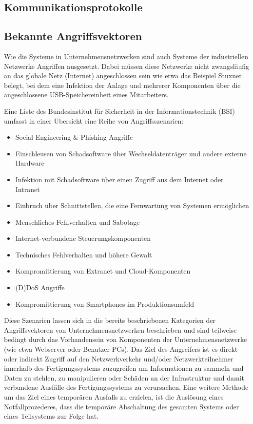 \subsection{Kommunikationsprotokolle	}

\subsection{Bekannte Angriffsvektoren}
Wie die Systeme in Unternehmensnetzwerken sind auch Systeme der industriellen Netzwerke Angriffen ausgesetzt. Dabei müssen diese Netzwerke nicht zwangsläufig an das globale Netz (Internet) angeschlossen sein wie etwa das Beispiel Stuxnet belegt, bei dem eine Infektion der Anlage und mehrerer Komponenten über die angeschlossene USB-Speichereinheit eines Mitarbeiters.

Eine Liste des Bundesinstitut für Sicherheit in der Informationstechnik (BSI) \citep{IndAttVec1} umfasst in einer Übersicht eine Reihe von Angriffsszenarien:
\begin{itemize}
\item Social Engineering \& Phishing Angriffe
\item Einschleusen von Schadsoftware über Wechseldatenträger und andere externe Hardware
\item Infektion mit Schadsoftware über einen Zugriff aus dem Internet oder Intranet
\item Einbruch über Schnittstellen, die eine Fernwartung von Systemen ermöglichen
\item Menschliches Fehlverhalten und Sabotage
\item Internet-verbundene Steuerungskomponenten
\item Technisches Fehlverhalten und höhere Gewalt
\item Kompromittierung von Extranet und Cloud-Komponenten
\item (D)DoS Angriffe
\item Kompromittierung von Smartphones im Produktionsumfeld
\end{itemize}

Diese Szenarien lassen sich in die bereits beschriebenen Kategorien der Angriffsvektoren von Unternehmensnetzwerken beschrieben und sind teilweise bedingt durch das Vorhandensein von Komponenten der Unternehmensnetzwerke (wie etwa Webserver oder Benutzer-PCs).
Das Ziel des Angreifers ist es direkt oder indirekt Zugriff auf den Netzwerkverkehr und/oder Netzwerkteilnehmer innerhalb des Fertigungssystems zuzugreifen um Informationen zu sammeln und Daten zu stehlen, zu manipulieren oder Schäden an der Infrastruktur und damit verbundene Ausfälle des Fertigungssystems zu verursachen. Eine weitere Methode um das Ziel eines temporären Ausfalls zu erzielen, ist die Auslösung eines Notfallprozederes, dass die temporäre Abschaltung des gesamten Systems oder eines Teilsystems zur Folge hat.

